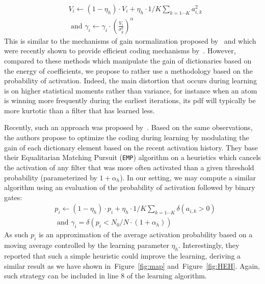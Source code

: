 \documentclass[vision,article,submit,oneauthor,pdftex]{Definitions/mdpi}
\newcommand{\seeFig}[1]{Figure~\ref{fig:#1}}%
\begin{document}
{\begin{align}
&V_i \leftarrow (1- \eta_h ) \cdot V_i + \eta_h \cdot 1/K\sum_{k=1\cdots K} a_{i, k}^2 \\ &\textrm{ and }
\gamma_i \leftarrow \gamma_i \cdot \left( \frac{V_i}{\sigma_g^2} \right)^\alpha
\end{align}%
This is similar to the mechanisms of gain normalization proposed by~\cite{Schwartz01} and which were recently shown to provide efficient coding mechanisms by~\cite{Simoncelli01}. However, compared to these methods which manipulate the gain of dictionaries based on the energy of coefficients, we propose to rather use a methodology based on the probability of activation. Indeed, the main distortion that occurs during learning is on higher statistical moments rather than variance, for instance when an atom is winning more frequently during the earliest iterations, its pdf will typically be more kurtotic than a filter that has learned less.

Recently, such an approach was proposed by~\cite{Sandin17}. Based on the same observations, the authors propose to optimize the coding during learning by modulating the gain of each dictionary element based on the recent activation history. They base their Equalitarian Matching Pursuit (\texttt{EMP}) algorithm on a heuristics which cancels the activation of any filter that was more often activated than a given threshold probability (parameterized by $1+\alpha_h$). In our setting, we may compute a similar algorithm using an evaluation of the probability of activation followed by binary gates:
\begin{align}%
&p_i \leftarrow (1- \eta_h ) \cdot p_i + \eta_h \cdot 1/K\sum_{k=1\cdots K} \delta(a_{i, k} > 0) \\ &\textrm{ and }
\gamma_i = \delta (p_i < N_0/N \cdot (1+\alpha_h) )
\end{align}%
As such $p_i$ is an approximation of the average activation probability based on a moving average controlled by the learning parameter $\eta_h$.
Interestingly, they reported that such a simple heuristic could improve the learning, deriving a similar result as we have shown in~\seeFig{map} and~\seeFig{HEH}. %
Again, such strategy can be included in line 8 of the learning algorithm.

}
\end{document}
